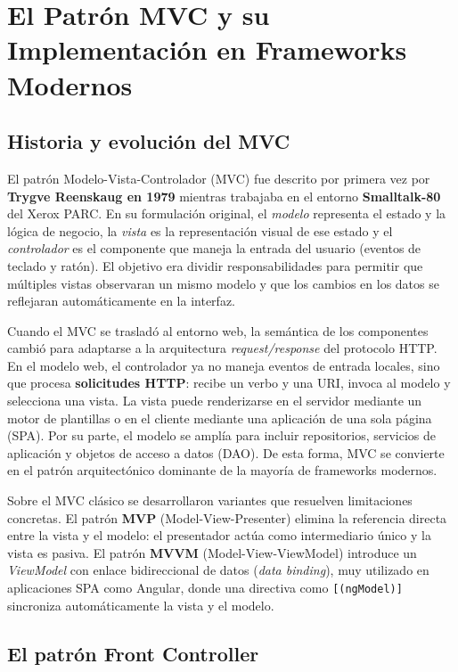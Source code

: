 \section{El Patrón MVC y su Implementación en Frameworks Modernos}
\subsection{Historia y evolución del MVC}

El patrón Modelo-Vista-Controlador (MVC) fue descrito por primera vez por \textbf{Trygve Reenskaug en 1979}
mientras trabajaba en el entorno \textbf{Smalltalk-80} del Xerox PARC. En su formulación original, el
\textit{modelo} representa el estado y la lógica de negocio, la \textit{vista} es la representación visual de ese
estado y el \textit{controlador} es el componente que maneja la entrada del usuario (eventos de teclado y ratón).
El objetivo era dividir responsabilidades para permitir que múltiples vistas observaran un mismo modelo y que los
cambios en los datos se reflejaran automáticamente en la interfaz.

Cuando el MVC se trasladó al entorno web, la semántica de los componentes cambió para adaptarse a la
arquitectura \textit{request/response} del protocolo HTTP. En el modelo web, el controlador ya no maneja eventos de
entrada locales, sino que procesa \textbf{solicitudes HTTP}: recibe un verbo y una URI, invoca al modelo y
selecciona una vista. La vista puede renderizarse en el servidor mediante un motor de plantillas o en el cliente
mediante una aplicación de una sola página (SPA). Por su parte, el modelo se amplía para incluir repositorios,
servicios de aplicación y objetos de acceso a datos (DAO). De esta forma, MVC se convierte en el patrón
arquitectónico dominante de la mayoría de frameworks modernos.

Sobre el MVC clásico se desarrollaron variantes que resuelven limitaciones concretas. El patrón \textbf{MVP}
(Model-View-Presenter) elimina la referencia directa entre la vista y el modelo: el presentador actúa como
intermediario único y la vista es pasiva. El patrón \textbf{MVVM} (Model-View-ViewModel) introduce un
\textit{ViewModel} con enlace bidireccional de datos (\textit{data binding}), muy utilizado en aplicaciones SPA
como Angular, donde una directiva como \texttt{[(ngModel)]} sincroniza automáticamente la vista y el modelo.

\subsection{El patrón Front Controller}

